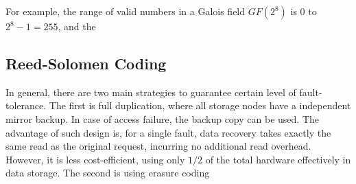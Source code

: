 For example, the range of valid numbers in a Galois field $GF(2^8)$ is $0$ to $2^8-1=255$, and the 


\subsection{Reed-Solomen Coding}

In general, there are two main strategies to guarantee certain level of fault-tolerance. The first is full duplication, where all storage nodes have a independent mirror backup. In case of access failure, the backup copy can be used. The advantage of such design is, for a single fault, data recovery takes exactly the same read as the original request, incurring no additional read overhead. However, it is less cost-efficient, using only $1/2$ of the total hardware effectively in data storage. The second is using erasure coding